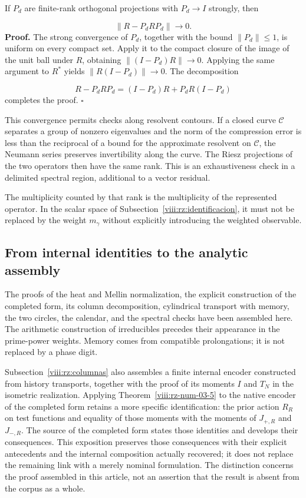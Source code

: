If \(P_d\) are finite-rank orthogonal projections with \(P_d\to I\) strongly, then

\[
\|R-P_dRP_d\|\longrightarrow0.
\]
\textbf{Proof.} The strong convergence of \(P_d\), together with the bound \(\|P_d\|\leq1\), is uniform on every compact set. Apply it to the compact closure of the image of the unit ball under \(R\), obtaining \(\|(I-P_d)R\|\to0\). Applying the same argument to \(R^*\) yields \(\|R(I-P_d)\|\to0\). The decomposition

\[
R-P_dRP_d=(I-P_d)R+P_dR(I-P_d)
\]
completes the proof. \hfill\(\square\)

This convergence permits checks along resolvent contours. If a closed curve \(\mathcal C\) separates a group of nonzero eigenvalues and the norm of the compression error is less than the reciprocal of a bound for the approximate resolvent on \(\mathcal C\), the Neumann series preserves invertibility along the curve. The Riesz projections of the two operators then have the same rank. This is an exhaustiveness check in a delimited spectral region, additional to a vector residual.

The multiplicity counted by that rank is the multiplicity of the represented operator. In the scalar space of Subsection~\ref{viii:rz:identificacion}, it must not be replaced by the weight \(m_\gamma\) without explicitly introducing the weighted observable.

\subsection{From internal identities to the analytic assembly}
\label{viii:rz:alcance}
The proofs of the heat and Mellin normalization, the explicit construction of the completed form, its column decomposition, cylindrical transport with memory, the two circles, the calendar, and the spectral checks have been assembled here. The arithmetic construction of irreducibles precedes their appearance in the prime-power weights. Memory comes from compatible prolongations; it is not replaced by a phase digit.

Subsection~\ref{viii:rz:columnas} also assembles a finite internal encoder constructed from history transports, together with the proof of its moments \(I\) and \(T_N\) in the isometric realization. Applying Theorem~\ref{viii:rz-num-03-5} to the native encoder of the completed form retains a more specific identification: the prior action \(R_R\) on test functions and equality of those moments with the moments of \(J_{+,R}\) and \(J_{-,R}\). The source of the completed form states those identities and develops their consequences. This exposition preserves those consequences with their explicit antecedents and the internal composition actually recovered; it does not replace the remaining link with a merely nominal formulation. The distinction concerns the proof assembled in this article, not an assertion that the result is absent from the corpus as a whole.

